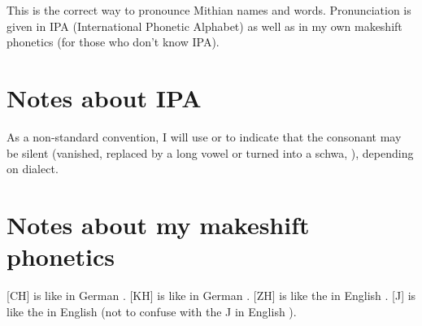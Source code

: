 \label{PronunIPA}




\indent 
This is the correct way to pronounce Mithian names and words. Pronunciation is given in IPA (International Phonetic Alphabet) as well as in my own makeshift phonetics (for those who don't know IPA). 









\section{Notes about IPA}
As a non-standard convention, I will use \textipa{[(\rr)]} or \textipa{[(\gr)]} to indicate that the consonant may be silent (vanished, replaced by a long vowel or turned into a schwa, \textipa{[@]}), depending on dialect. 









\section{Notes about my makeshift phonetics}
[CH] is like in German . [KH] is like in German . [ZH] is like the  in English . [J] is like the  in English  (not to confuse with the  J in English ). 

